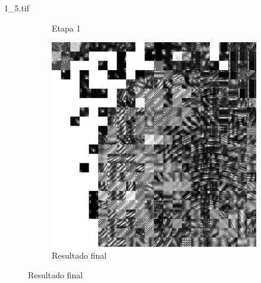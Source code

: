 \documentclass{beamer}
\begin{document}
\begin{frame}{1\_5.tif}
\begin{figure}
\begin{subfigure}[!ht]{0.32\textwidth}
                \caption{Etapa 1}
            \end{subfigure}
            \begin{subfigure}[!ht]{0.32\textwidth}
                \includegraphics[width=\columnwidth]{Fingerprints/1_5_final.jpg}
                \caption{Resultado final}
            \end{subfigure}
        \end{figure}
    \end{frame}
\end{document}
